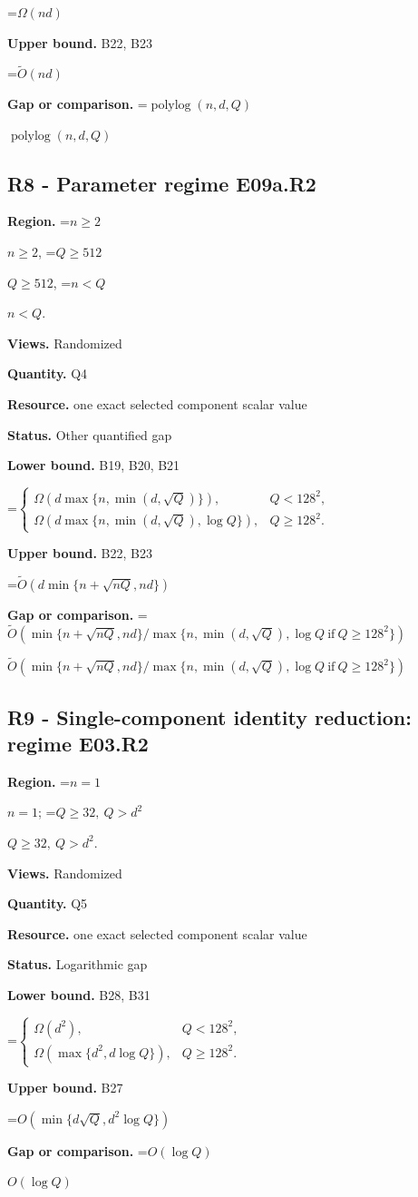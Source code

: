 \documentclass[10pt,a4paper]{article}
\newcommand{\AtlasMath}[1]{\par\begingroup\centering\setbox0=\hbox{$\displaystyle #1$}\ifdim\wd0>1.4\linewidth\typeout{ATLAS WIDE FORMULA: \the\wd0}\fi\ifdim\wd0>\linewidth\resizebox{\linewidth}{!}{\box0}\else\box0\fi\par\endgroup}
\newcommand{\AtlasInlineMath}[1]{\begingroup\setbox0=\hbox{$#1$}\ifdim\wd0>.4\linewidth\endgroup\AtlasMath{#1}\else\endgroup$#1$\fi}
\begin{document}
\AtlasMath{\Omega(nd)}
\textbf{Upper bound.} B22, B23

\AtlasMath{\widetilde{O}(nd)}
\textbf{Gap or comparison.} \AtlasInlineMath{\operatorname{polylog}(n,d,Q)}

\subsection{R8 - Parameter regime E09a.R2}
\textbf{Region.} \AtlasInlineMath{n\ge2}, \AtlasInlineMath{Q\ge512}, \AtlasInlineMath{n<Q}.

\textbf{Views.} Randomized

\textbf{Quantity.} Q4

\textbf{Resource.} one exact selected component scalar value

\textbf{Status.} Other quantified gap

\textbf{Lower bound.} B19, B20, B21

\AtlasMath{\begin{cases}\Omega(d\max\{n,\min(d,\sqrt Q)\}),&Q<128^2,\\\Omega(d\max\{n,\min(d,\sqrt Q),\log Q\}),&Q\ge128^2.\end{cases}}
\textbf{Upper bound.} B22, B23

\AtlasMath{\widetilde{O}(d\min\{n+\sqrt{nQ},nd\})}
\textbf{Gap or comparison.} \AtlasInlineMath{\widetilde{O}(\min\{n+\sqrt{nQ},nd\}/\max\{n,\min(d,\sqrt Q),\log Q\ \mathrm{if}\ Q\ge128^2\})}

\subsection{R9 - Single-component identity reduction: regime E03.R2}
\textbf{Region.} \AtlasInlineMath{n=1}; \AtlasInlineMath{Q\ge32,\ Q>d^2}.

\textbf{Views.} Randomized

\textbf{Quantity.} Q5

\textbf{Resource.} one exact selected component scalar value

\textbf{Status.} Logarithmic gap

\textbf{Lower bound.} B28, B31

\AtlasMath{\begin{cases}\Omega(d^2),&Q<128^2,\\\Omega(\max\{d^2,d\log Q\}),&Q\ge128^2.\end{cases}}
\textbf{Upper bound.} B27

\AtlasMath{O(\min\{d\sqrt Q,d^2\log Q\})}
\textbf{Gap or comparison.} \AtlasInlineMath{O(\log Q)}
\end{document}
